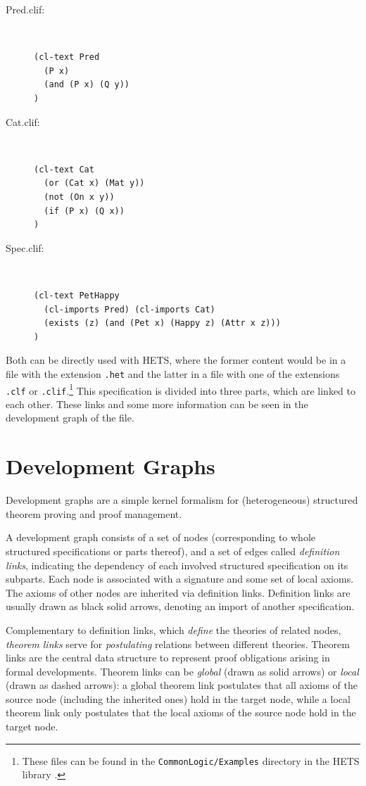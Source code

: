 \documentclass{article}
\newcommand{\normalTEXTSC}[2]{{#1\scriptsize#2}}
\newcommand     {\Hets}{\normalTEXTSC{H}{ETS}\xspace}
\begin{document}
\begin{description}
  \item[Pred.clif:]~\\
\begin{lstlisting}[language=clif]
(cl-text Pred 
  (P x)
  (and (P x) (Q y))
)
\end{lstlisting}
  \item[Cat.clif:]~\\
\begin{lstlisting}[language=clif]
(cl-text Cat 
  (or (Cat x) (Mat y))
  (not (On x y))
  (if (P x) (Q x))
)
\end{lstlisting}
  \item[Spec.clif:]~\\
\begin{lstlisting}[language=clif]
(cl-text PetHappy 
  (cl-imports Pred) (cl-imports Cat)
  (exists (z) (and (Pet x) (Happy z) (Attr x z)))
)
\end{lstlisting}
\end{description}

Both can be directly used with \Hets, where the former content would be in a 
file with the extension \texttt{.het} and the latter in a file with one of the extensions 
\texttt{.clf} or \texttt{.clif}.\footnote{These files can be found in the \texttt{CommonLogic/Examples} directory in the \Hets library \cite{hets-library:URL}.} This specification is divided into three 
parts, which are linked to each other. These links and some more information can 
be seen in the development graph of the file.


\section{Development Graphs}\label{sec:DevGraph}

Development graphs are a simple kernel formalism for (heterogeneous)
structured theorem proving and proof management.

A development graph consists of a set of nodes (corresponding to whole
structured specifications or parts thereof), and a set of edges
called \emph{definition links}, indicating the dependency of each
involved structured specification on its subparts.  Each node is
associated with a signature and some set of local axioms.  The axioms
of other nodes are inherited via definition links.  Definition links
are usually drawn as black solid arrows, denoting an import of another
specification.

Complementary to definition links, which \emph{define} the theories of
related nodes, \emph{theorem links} serve for \emph{postulating}
relations between different theories. Theorem links are the central
data structure to represent proof obligations arising in formal
developments.
Theorem links can be \emph{global} (drawn as solid arrows) or
\emph{local} (drawn as dashed arrows): a global theorem link
postulates that all axioms of the source node (including the inherited
ones) hold in the target node, while a local theorem link only postulates
that the local axioms of the source node hold in the target node.
\end{document}
